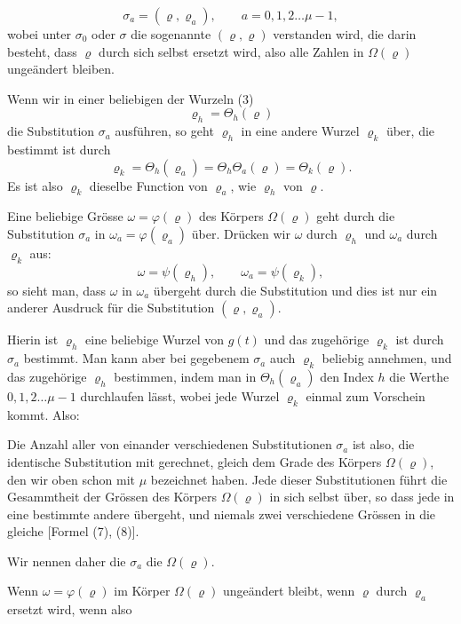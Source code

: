 
\[
\sigma_a = (\varrho, \varrho_a), \qquad a = 0, 1, 2 \ldots \mu - 1,
\]
wobei unter $\sigma_0$ oder $\sigma$ die sogenannte  $(\varrho, \varrho)$ verstanden wird, die darin besteht, dass $\varrho$ durch sich selbst ersetzt wird, also alle Zahlen in $\Omega(\varrho)$ ungeändert bleiben.

Wenn wir in einer beliebigen der Wurzeln (3)
\[
\varrho_h = \Theta_h(\varrho)
\]
die Substitution $\sigma_a$ ausführen, so geht $\varrho_h$ in eine andere Wurzel $\varrho_k$ über, die bestimmt ist durch
\[
\varrho_k = \Theta_h(\varrho_a) = \Theta_h \Theta_a(\varrho) = \Theta_k(\varrho).
\]
Es ist also $\varrho_k$ dieselbe Function von $\varrho_a$, wie $\varrho_h$ von $\varrho$.

Eine beliebige Grösse $\omega = \varphi(\varrho)$ des Körpers $\Omega(\varrho)$ geht durch die Substitution $\sigma_a$ in $\omega_a = \varphi(\varrho_a)$ über. Drücken wir $\omega$ durch $\varrho_h$ und $\omega_a$ durch $\varrho_k$ aus:
\[
\omega = \psi(\varrho_h), \qquad \omega_a = \psi(\varrho_k),
\]
so sieht man, dass $\omega$ in $\omega_a$ übergeht durch die Substitution
und dies ist nur ein anderer Ausdruck für die Substitution $(\varrho, \varrho_a)$.

Hierin ist $\varrho_h$ eine beliebige Wurzel von $g(t)$ und das zugehörige $\varrho_k$ ist durch $\sigma_a$ bestimmt. Man kann aber bei gegebenem $\sigma_a$ auch $\varrho_k$ beliebig annehmen, und das zugehörige $\varrho_h$ bestimmen, indem man in $\Theta_h(\varrho_a)$ den Index $h$ die Werthe $0, 1, 2 \ldots \mu - 1$ durchlaufen lässt, wobei jede Wurzel $\varrho_k$ einmal zum Vorschein kommt. Also:


Die Anzahl aller von einander verschiedenen Substitutionen $\sigma_a$ ist also, die identische Substitution mit gerechnet, gleich dem Grade des Körpers $\Omega(\varrho)$, den wir oben schon mit $\mu$ bezeichnet haben. Jede dieser Substitutionen führt die Gesammtheit der Grössen des Körpers $\Omega(\varrho)$ in sich selbst über, so dass jede in eine bestimmte andere übergeht, und niemals zwei verschiedene Grössen in die gleiche [Formel (7), (8)].

Wir nennen daher die $\sigma_a$ die  $\Omega(\varrho)$.

Wenn $\omega = \varphi(\varrho)$ im Körper $\Omega(\varrho)$ ungeändert bleibt, wenn $\varrho$ durch $\varrho_a$ ersetzt wird, wenn also
